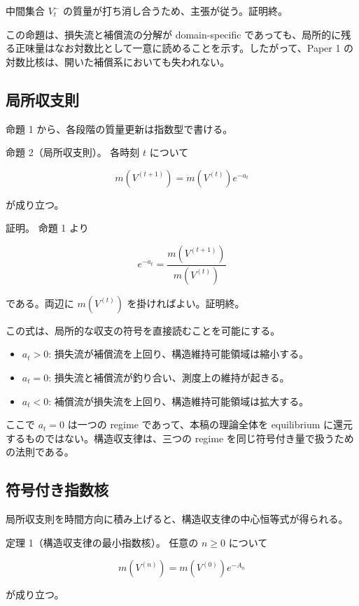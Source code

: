 \documentclass[12pt,a4paper]{article}
\begin{document}
中間集合 \(V_{t}^-\) の質量が打ち消し合うため、主張が従う。証明終。

この命題は、損失流と補償流の分解が domain-specific であっても、局所的に残る正味量はなお対数比として一意に読めることを示す。したがって、Paper 1 の対数比核は、開いた補償系においても失われない。

\subsection{局所収支則}\label{ux5c40ux6240ux53ceux652fux5247}

命題 1 から、各段階の質量更新は指数型で書ける。

命題 2（局所収支則）。 各時刻 \(t\) について

\[
m(V^{(t+1)}) = m(V^{(t)}) e^{-a_{t}}
\]

が成り立つ。

証明。 命題 1 より

\[
e^{-a_{t}} = \frac{m(V^{(t+1)})}{m(V^{(t)})}
\]

である。両辺に \(m(V^{(t)})\) を掛ければよい。証明終。

この式は、局所的な収支の符号を直接読むことを可能にする。

\begin{itemize}
\tightlist
\item
  \(a_{t}>0\): 損失流が補償流を上回り、構造維持可能領域は縮小する。
\item
  \(a_{t}=0\): 損失流と補償流が釣り合い、測度上の維持が起きる。
\item
  \(a_{t}<0\): 補償流が損失流を上回り、構造維持可能領域は拡大する。
\end{itemize}

ここで \(a_{t}=0\) は一つの regime であって、本稿の理論全体を equilibrium に還元するものではない。構造収支律は、三つの regime を同じ符号付き量で扱うための法則である。

\subsection{符号付き指数核}\label{ux7b26ux53f7ux4ed8ux304dux6307ux6570ux6838}

局所収支則を時間方向に積み上げると、構造収支律の中心恒等式が得られる。

定理 1（構造収支律の最小指数核）。 任意の \(n\ge 0\) について

\[
m(V^{(n)}) = m(V^{(0)}) e^{-A_{n}}
\]

が成り立つ。
\end{document}
